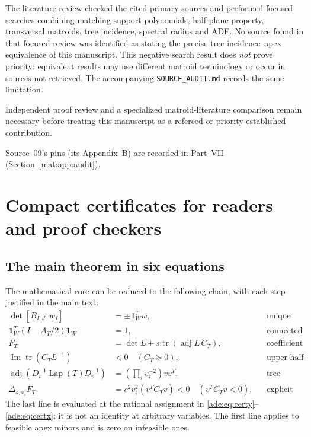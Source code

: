 \documentclass[11pt]{article}
\numberwithin{equation}{section}
\theoremstyle{definition}
\newcommand{\one}{\mathbf 1}
\newcommand{\adj}{\operatorname{adj}}
\newcommand{\tr}{\operatorname{tr}}
\newcommand{\Lap}{\operatorname{Lap}}
\newcommand{\del}{\Delta}
\newcommand{\im}{\operatorname{Im}}
\begin{document}
The literature review checked the cited primary sources and performed
focused searches combining matching-support polynomials, half-plane
property, transversal matroids, tree incidence, spectral radius and ADE.
No source found in that focused review was identified as stating the
precise tree incidence--apex equivalence of this manuscript.  This
negative search result does \emph{not} prove priority: equivalent results
may use different matroid terminology or occur in sources not retrieved.
The accompanying \texttt{SOURCE\_AUDIT.md} records the same limitation.

Independent proof review and a specialized matroid-literature comparison
remain necessary before treating this manuscript as a refereed or
priority-established contribution.

Source~09's pins (its Appendix~B) are recorded in Part~VII
(Section~\ref{mat:app:audit}).

\section{Compact certificates for readers and proof checkers}
\label{ade:app:certificates}

\subsection{The main theorem in six equations}

The mathematical core can be reduced to the following chain, with each
step justified in the main text:
\begin{align*}
 \det[B_{I,J}\ \ w_I]&=\pm\one_W^T w,
     &&\text{unique unrooted component;}\\
 \one_W^T(I-A_T/2)\one_W&=1,
     &&\text{connected subtree;}\\
 F_T&=\det L+s\tr(\adj L\,C_T),
     &&\text{coefficient identity;}\\
 \im\tr(C_TL^{-1})&<0\quad(C_T\succeq0),
     &&\text{upper-half-plane nonvanishing;}\\
 \adj(D_v^{-1}\Lap(T)D_v^{-1})&=
        \left(\prod_i v_i^{-2}\right)vv^T,
     &&\text{tree cofactors;}\\
 \del_{s,x_i}F_T&=c^2v_i^2(v^TC_Tv)<0\quad(v^TC_Tv<0),
     &&\text{explicit obstruction.}
\end{align*}
The last line is evaluated at the rational assignment in
\eqref{ade:eq:certy}--\eqref{ade:eq:certx}; it is not an identity at arbitrary
variables.  The first line applies to feasible apex minors and is zero
on infeasible ones.
\end{document}
